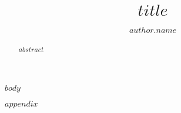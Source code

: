 \documentclass[a4paper,
               $if(lipics.anonymous)$anonymous,$endif$
               UKenglish,
               cleveref,
               autoref,
               thm-restate]{lipics-v2021}
\title{$title$}
\author{$author.name$}{$author.affiliation$}{$author.email$}{$author.orcid$}{$author.funding$}
\begin{document}
\maketitle

\begin{abstract}
    $abstract$
\end{abstract}

$body$



\appendix

$appendix$
\end{document}
